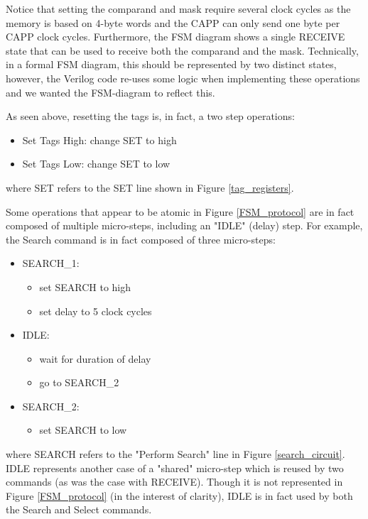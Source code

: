 Notice that setting the comparand and mask require several clock cycles as the memory is based on 4-byte words and the CAPP can only send one byte per CAPP clock cycles. Furthermore, the FSM diagram shows a single RECEIVE state that can be used to receive both the comparand and the mask. Technically, in a formal FSM diagram, this should be represented by two distinct states, however, the Verilog code re-uses some logic when implementing these operations and we wanted the FSM-diagram to reflect this.

As seen above, resetting the tags is, in fact, a two step operations:

\begin{itemize}
    \item Set Tags High: change SET to high
    \item Set Tags Low: change SET to low
\end{itemize}
where SET refers to the SET line shown in Figure \ref{tag_registers}.

Some operations that appear to be atomic in Figure \ref{FSM_protocol} are in fact composed of multiple micro-steps, including an "IDLE" (delay) step. For example, the Search command is in fact composed of three micro-steps:

\begin{itemize}
    \item SEARCH\_1: 
        \begin{itemize}
            \item set SEARCH to high
            \item set delay to 5 clock cycles
        \end{itemize}
    \item IDLE:
        \begin{itemize}
            \item wait for duration of delay
            \item go to SEARCH\_2
        \end{itemize}
    \item SEARCH\_2: 
        \begin{itemize}
            \item set SEARCH to low
        \end{itemize}
\end{itemize}

where SEARCH refers to the "Perform Search" line in Figure \ref{search_circuit}. IDLE represents another case of a "shared" micro-step which is reused by two commands (as was the case with RECEIVE). Though it is not represented in Figure \ref{FSM_protocol} (in the interest of clarity), IDLE is in fact used by both the Search and Select commands.
